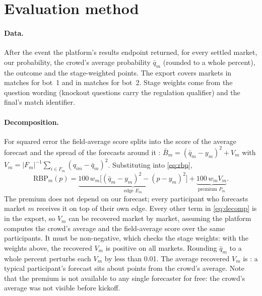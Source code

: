 \documentclass[11pt]{article}
\newcommand{\RBP}{\mathrm{RBP}}
\begin{document}
\section{Evaluation method}\label{sec:method}

\paragraph{Data.}
After the event the platform's results endpoint returned, for every settled market, our
probability, the crowd's average probability $\bar q_m$ (rounded to a whole percent), the
outcome and the stage-weighted points. The export covers \MarketsOne{} markets in \MatchesOne{}
matches for bot~1 and \MarketsTwo{} in \MatchesTwo{} matches for bot~2. Stage weights come from
the question wording (knockout questions carry the regulation qualifier) and the final's match
identifier.

\paragraph{Decomposition.}
For squared error the field-average score splits into the score of the average forecast and the
spread of the forecasts around it \citep{krogh1995, page2007}:
$\bar B_m=(\bar q_m-y_m)^2+V_m$ with $V_m=|F_m|^{-1}\sum_{i\in F_m}(q_{im}-\bar q_m)^2$.
Substituting into \cref{eq:rbp},
\begin{equation}\label{eq:decomp}
  \RBP_m(p)=\underbrace{100\,w_m\bigl[(\bar q_m-y_m)^2-(p-y_m)^2\bigr]}_{\text{edge }E_m}
           +\underbrace{100\,w_m V_m}_{\text{premium }P_m}.
\end{equation}
The premium does not depend on our forecast; every participant who forecasts market $m$
receives it on top of their own edge. Every other term in \cref{eq:decomp} is in the export,
so $V_m$ can be recovered market by market, assuming the platform computes the crowd's average
and the field-average score over the same participants. It must be non-negative, which checks
the stage weights: with the weights above, the recovered $V_m$ is positive on all \MarketsBoth{} markets.
Rounding $\bar q_m$ to a whole percent perturbs each $V_m$ by less than 0.01. The average
recovered $V_m$ is \FieldVariance{}: a typical participant's forecast sits about \FieldSD{}
points from the crowd's average. Note that the premium is not available to any single
forecaster for free: the crowd's average was not visible before kickoff.
\end{document}
